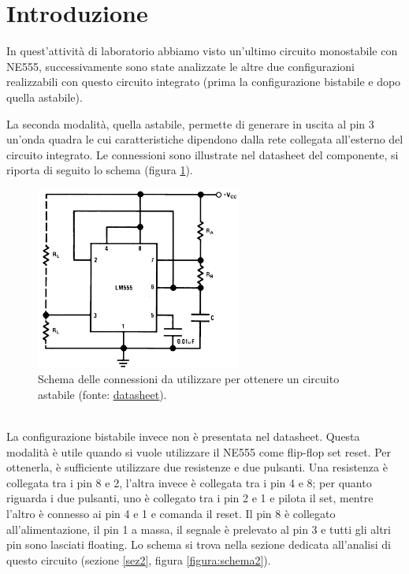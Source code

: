\documentclass{report}
\begin{document}
\section*{Introduzione}
In quest'attività di laboratorio abbiamo visto un'ultimo circuito monostabile con NE555, successivamente sono state analizzate le altre due configurazioni realizzabili con questo circuito integrato (prima la configurazione bistabile e dopo quella astabile).  \par
La seconda modalità, quella astabile, permette di generare in uscita al pin 3 un'onda quadra le cui caratteristiche dipendono dalla rete collegata all'esterno del circuito integrato. Le connessioni sono illustrate nel datasheet del componente, si riporta di seguito lo schema (figura \ref{figura:datasheet1}).
\begin{figure}[h!]
	\centering
	\includegraphics[height=6cm]{immagini/datasheet1}
	\caption{Schema delle connessioni da utilizzare per ottenere un circuito astabile (fonte: \textcolor{blue}{\underline{\href{https://www.ti.com/lit/ds/symlink/lm555.pdf?ts=1667144089940&ref_url=https\%253A\%252F\%252Fwww.ti.com\%252Fproduct\%252FLM555}{datasheet}}}).} %
	\label{figura:datasheet1}
\end{figure}
\\ La configurazione bistabile invece non è presentata nel datasheet. Questa modalità è utile quando si vuole utilizzare il NE555 come flip-flop set reset. Per ottenerla, è sufficiente utilizzare due resistenze e due pulsanti. Una resistenza è collegata tra i pin 8 e 2, l'altra invece è collegata tra i pin 4 e 8; per quanto riguarda i due pulsanti, uno è collegato tra i pin 2 e 1 e pilota il set, mentre l'altro è connesso ai pin 4 e 1 e comanda il reset. Il pin 8 è collegato all'alimentazione, il pin 1 a massa, il segnale è prelevato al pin 3 e tutti gli altri pin sono lasciati floating. Lo schema si trova nella sezione dedicata all'analisi di questo circuito (sezione \ref{sez2}, figura \ref{figura:schema2}).
\newpage
\end{document}
